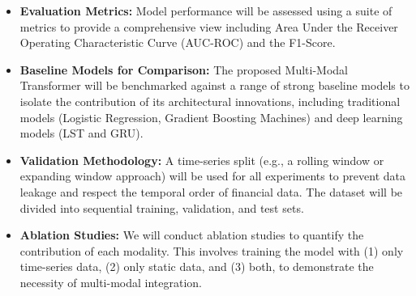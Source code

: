 \begin{itemize}
	\item \textbf{Evaluation Metrics: } Model performance will be assessed using a suite of metrics to provide a comprehensive view including Area Under the Receiver Operating Characteristic Curve (AUC-ROC) and the F1-Score.
	\item \textbf{Baseline Models for Comparison: } The proposed Multi-Modal Transformer will be benchmarked against a range of strong baseline models to isolate the contribution of its architectural innovations, including traditional models (Logistic Regression, Gradient Boosting Machines) and deep learning models (LST and GRU).
	\item \textbf{Validation Methodology: } A time-series split (e.g., a rolling window or expanding window approach) will be used for all experiments to prevent data leakage and respect the temporal order of financial data. The dataset will be divided into sequential training, validation, and test sets.
	\item \textbf{Ablation Studies: } We will conduct ablation studies to quantify the contribution of each modality. This involves training the model with (1) only time-series data, (2) only static data, and (3) both, to demonstrate the necessity of multi-modal integration.
\end{itemize}

